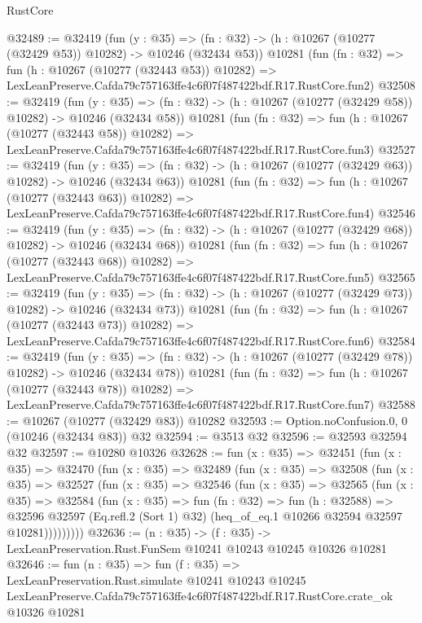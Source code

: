 \begin{lexlean}{RustCore}
\begin{coremodule}
@32489 := @32419
    (fun (y : @35) =>
    (fn : @32) -> (h : @10267 (@10277 (@32429 @53)) @10282) -> @10246 (@32434 @53))
    @10281
    (fun (fn : @32) =>
    fun (h : @10267 (@10277 (@32443 @53)) @10282) =>
    LexLeanPreserve.Cafda79c757163ffe4c6f07f487422bdf.R17.RustCore.fun2)
@32508 := @32419
    (fun (y : @35) =>
    (fn : @32) -> (h : @10267 (@10277 (@32429 @58)) @10282) -> @10246 (@32434 @58))
    @10281
    (fun (fn : @32) =>
    fun (h : @10267 (@10277 (@32443 @58)) @10282) =>
    LexLeanPreserve.Cafda79c757163ffe4c6f07f487422bdf.R17.RustCore.fun3)
@32527 := @32419
    (fun (y : @35) =>
    (fn : @32) -> (h : @10267 (@10277 (@32429 @63)) @10282) -> @10246 (@32434 @63))
    @10281
    (fun (fn : @32) =>
    fun (h : @10267 (@10277 (@32443 @63)) @10282) =>
    LexLeanPreserve.Cafda79c757163ffe4c6f07f487422bdf.R17.RustCore.fun4)
@32546 := @32419
    (fun (y : @35) =>
    (fn : @32) -> (h : @10267 (@10277 (@32429 @68)) @10282) -> @10246 (@32434 @68))
    @10281
    (fun (fn : @32) =>
    fun (h : @10267 (@10277 (@32443 @68)) @10282) =>
    LexLeanPreserve.Cafda79c757163ffe4c6f07f487422bdf.R17.RustCore.fun5)
@32565 := @32419
    (fun (y : @35) =>
    (fn : @32) -> (h : @10267 (@10277 (@32429 @73)) @10282) -> @10246 (@32434 @73))
    @10281
    (fun (fn : @32) =>
    fun (h : @10267 (@10277 (@32443 @73)) @10282) =>
    LexLeanPreserve.Cafda79c757163ffe4c6f07f487422bdf.R17.RustCore.fun6)
@32584 := @32419
    (fun (y : @35) =>
    (fn : @32) -> (h : @10267 (@10277 (@32429 @78)) @10282) -> @10246 (@32434 @78))
    @10281
    (fun (fn : @32) =>
    fun (h : @10267 (@10277 (@32443 @78)) @10282) =>
    LexLeanPreserve.Cafda79c757163ffe4c6f07f487422bdf.R17.RustCore.fun7)
@32588 := @10267 (@10277 (@32429 @83)) @10282
@32593 := Option.noConfusion.{0, 0} (@10246 (@32434 @83)) @32
@32594 := @3513 @32
@32596 := @32593 @32594 @32
@32597 := @10280 @10326
@32628 := fun (x : @35) =>
  @32451
    (fun (x : @35) =>
    @32470
      (fun (x : @35) =>
      @32489
        (fun (x : @35) =>
        @32508
          (fun (x : @35) =>
          @32527
            (fun (x : @35) =>
            @32546
              (fun (x : @35) =>
              @32565
                (fun (x : @35) =>
                @32584
                  (fun (x : @35) =>
                  fun (fn : @32) =>
                  fun (h : @32588) =>
                  @32596
                    @32597
                    (Eq.refl.{2} (Sort 1) @32)
                    (heq_of_eq.{1} @10266 @32594 @32597 @10281)))))))))
@32636 := (n : @35) ->
  (f : @35) -> LexLeanPreservation.Rust.FunSem @10241 @10243 @10245 @10326 @10281
@32646 := fun (n : @35) =>
  fun (f : @35) =>
  LexLeanPreservation.Rust.simulate
    @10241
    @10243
    @10245
    LexLeanPreserve.Cafda79c757163ffe4c6f07f487422bdf.R17.RustCore.crate_ok
    @10326
    @10281
\end{coremodule}
\end{lexlean}
